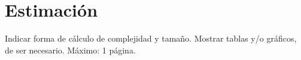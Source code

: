 \section{Estimación}
Indicar forma de cálculo de complejidad y tamaño.
Mostrar tablas y/o gráficos, de ser necesario.
Máximo: 1 página.
